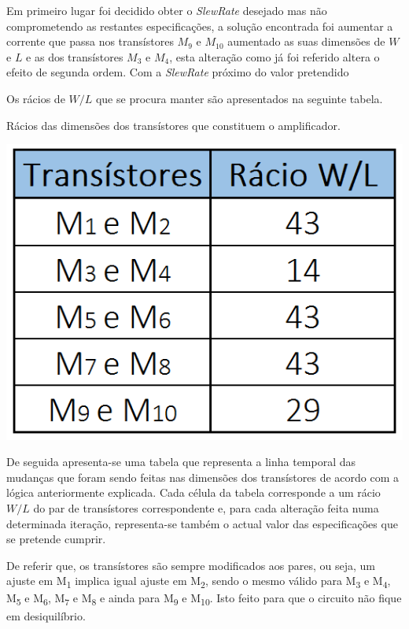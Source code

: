 \documentclass[11pt]{article}
\numberwithin{equation}{section}
\begin{document}
Em primeiro lugar foi decidido obter o \textit{SlewRate} desejado mas não comprometendo as restantes especificações, a solução encontrada foi aumentar a corrente que passa nos transístores $M_9$ e $M_10$ aumentado as suas dimensões de $W$ e $L$ e as dos transístores $M_3$ e $M_4$, esta alteração como já foi referido altera o efeito de segunda ordem. Com a \textit{SlewRate} próximo do valor pretendido 
	
Os rácios de $W/L$ que se procura manter são apresentados na seguinte tabela.

\begin{table}[H]
	\centering
	\caption{Rácios das dimensões dos transístores que constituem o amplificador.}
	\vspace{-1.5mm}
	\includegraphics[keepaspectratio=true, scale=0.33]{teoricas/racios}
\end{table}

De seguida apresenta-se uma tabela que representa a linha temporal das mudanças que foram sendo feitas nas dimensões dos transístores de acordo com a lógica anteriormente explicada. Cada célula da tabela corresponde a um rácio $W/L$ do par de transístores correspondente e, para cada alteração feita numa determinada iteração, representa-se também o actual valor das especificações que se pretende cumprir.

De referir que, os transístores são sempre modificados aos pares, ou seja, um ajuste em M\textsubscript{1} implica igual ajuste em M\textsubscript{2}, sendo o mesmo válido para M\textsubscript{3} e M\textsubscript{4}, M\textsubscript{5} e M\textsubscript{6}, M\textsubscript{7} e M\textsubscript{8} e ainda para M\textsubscript{9} e M\textsubscript{10}. Isto feito para que o circuito não fique em desiquilíbrio.
\end{document}
